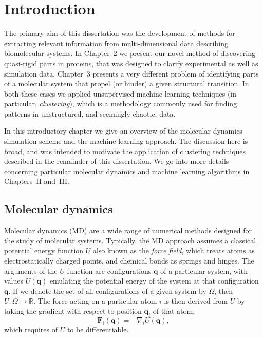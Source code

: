 \documentclass[a4paper,11pt,twoside]{book}%
\begin{document}
 



\tableofcontents

\chapter{Introduction}

The primary aim of this dissertation was the development of methods for extracting relevant information from multi-dimensional data describing biomolecular systems.
In Chapter~2 we present our novel method of discovering quasi-rigid parts in proteins, that was designed to clarify experimental as well as simulation data.
Chapter~3 presents a very different problem of identifying parts of a molecular system that propel (or hinder) a given structural transition.
In both these cases we applied unsupervised machine learning techniques (in particular, \emph{clustering}), which is a methodology commonly used for finding patterns in unstructured, and seemingly chaotic, data.

In this introductory chapter we give an overview of the molecular dynamics simulation scheme and the machine learning approach.
The discussion here is broad, and was intended to motivate the application of clustering techniques described in the remainder of this dissertation. %
We go into more details concerning particular molecular dynamics and machine learning algorithms in Chapters~II and~III. %


\section{Molecular dynamics}

Molecular dynamics (MD) are a wide range of numerical methods designed for the study of molecular systems.
Typically, the MD approach assumes a classical potential energy function $U$ also known as the \emph{force field}, which treats atoms as electrostatically charged points, and chemical bonds as springs and hinges.
The arguments of the $U$ function are configurations $\mathbf{q}$ of a particular system, with values $U(\mathbf{q})$ emulating the potential energy of the system at that configuration $\mathbf{q}$.
If we denote the set of all configurations of a given system by $\Omega$, then $U\colon\Omega\to\mathbb{R}$. %
The force acting on a particular atom $i$ is then derived from $U$ by taking the gradient with respect to position $\mathbf{q}_i$ of that atom:
$$
\mathbf{F}_i(\mathbf{q}) = -\nabla_i U(\mathbf{q}),
$$
which requires of $U$ to be differentiable. 
\end{document}
